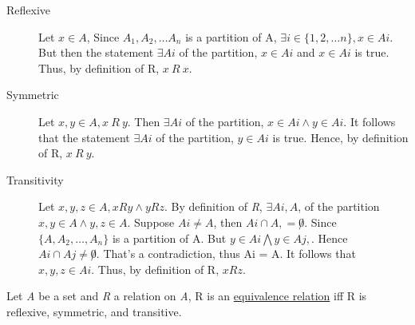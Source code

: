 \documentclass[12pt]{article}
\begin{document}
\begin{description}
\item[Reflexive] Let $x \in A$, Since $A_1, A_2, \ldots A_n$ is a partition of A, $\exists i \in \{ 1, 2, \ldots n \}, x \in Ai$. But then the statement $\exists Ai$ of the partition, $x \in Ai$ and $x \in Ai$ is true. Thus, by definition of R, $x \ R \ x$.

\item[Symmetric] Let $x,y \in A, x \ R \ y$. Then $ \exists Ai$ of the partition, $x \in Ai \wedge y \in Ai$. It follows that the statement $\exists Ai$ of the partition, $y \in Ai$ is true. Hence, by definition of R, $x \ R \ y$.


\item[Transitivity] Let $x, y, z \in A, x R y \wedge y R z.$ By definition of \textit{R}, $ \exists Ai, A$, of the partition $ x, y \in A \wedge y, z \in A$. Suppose $Ai \not = A$, then $Ai \cap A, = \not 0$. Since $\{ A, A_2, \ldots, A_n \} $ is a partition of A. But $ y \in Ai \bigwedge y \in Aj,$. Hence $ Ai \cap Aj \not = \not 0$. That's a contradiction, thus Ai = A. It follows that $x, y, z \in Ai$. Thus, by definition of R, $x R z$.

\end{description}

Let \textit{A} be a set and \textit{R} a relation on \textit{A}, R is an \underline{equivalence relation} iff R is reflexive, symmetric, and transitive.
\end{document}
